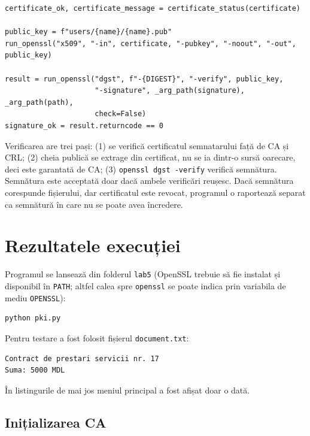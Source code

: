\documentclass[12pt,a4paper]{article}
\begin{document}
\begin{lstlisting}[caption={Verificarea semnăturii (fragment)}]
certificate_ok, certificate_message = certificate_status(certificate)

public_key = f"users/{name}/{name}.pub"
run_openssl("x509", "-in", certificate, "-pubkey", "-noout", "-out", public_key)

result = run_openssl("dgst", f"-{DIGEST}", "-verify", public_key,
                     "-signature", _arg_path(signature), _arg_path(path),
                     check=False)
signature_ok = result.returncode == 0
\end{lstlisting}

Verificarea are trei pași: (1) se verifică certificatul semnatarului față de CA
și CRL; (2) cheia publică se extrage din certificat, nu se ia dintr-o sursă
oarecare, deci este garantată de CA; (3) \texttt{openssl dgst -verify}
verifică semnătura. Semnătura este acceptată doar dacă ambele verificări
reușesc. Dacă semnătura corespunde fișierului, dar certificatul este revocat,
programul o raportează separat ca semnătură în care nu se poate avea încredere.

\section{Rezultatele execuției}

Programul se lansează din folderul \texttt{lab5} (OpenSSL trebuie să fie
instalat și disponibil în \texttt{PATH}; altfel calea spre \texttt{openssl} se
poate indica prin variabila de mediu \texttt{OPENSSL}):
\begin{lstlisting}[style=terminal]
python pki.py
\end{lstlisting}

Pentru testare a fost folosit fișierul \texttt{document.txt}:
\begin{lstlisting}[style=terminal]
Contract de prestari servicii nr. 17
Suma: 5000 MDL
\end{lstlisting}

În listingurile de mai jos meniul principal a fost afișat doar o dată.

\subsection{Inițializarea CA}
\end{document}
